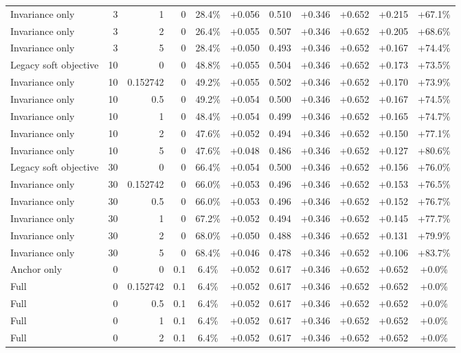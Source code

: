 \begin{table}[htbp]
\begin{tabular}{lrrrccccccc}
Invariance only & 3 & 1 & 0 & 28.4\% & +0.056 & 0.510 & +0.346 & +0.652 & +0.215 & +67.1\% \\
Invariance only & 3 & 2 & 0 & 26.4\% & +0.055 & 0.507 & +0.346 & +0.652 & +0.205 & +68.6\% \\
Invariance only & 3 & 5 & 0 & 28.4\% & +0.050 & 0.493 & +0.346 & +0.652 & +0.167 & +74.4\% \\
Legacy soft objective & 10 & 0 & 0 & 48.8\% & +0.055 & 0.504 & +0.346 & +0.652 & +0.173 & +73.5\% \\
Invariance only & 10 & 0.152742 & 0 & 49.2\% & +0.055 & 0.502 & +0.346 & +0.652 & +0.170 & +73.9\% \\
Invariance only & 10 & 0.5 & 0 & 49.2\% & +0.054 & 0.500 & +0.346 & +0.652 & +0.167 & +74.5\% \\
Invariance only & 10 & 1 & 0 & 48.4\% & +0.054 & 0.499 & +0.346 & +0.652 & +0.165 & +74.7\% \\
Invariance only & 10 & 2 & 0 & 47.6\% & +0.052 & 0.494 & +0.346 & +0.652 & +0.150 & +77.1\% \\
Invariance only & 10 & 5 & 0 & 47.6\% & +0.048 & 0.486 & +0.346 & +0.652 & +0.127 & +80.6\% \\
Legacy soft objective & 30 & 0 & 0 & 66.4\% & +0.054 & 0.500 & +0.346 & +0.652 & +0.156 & +76.0\% \\
Invariance only & 30 & 0.152742 & 0 & 66.0\% & +0.053 & 0.496 & +0.346 & +0.652 & +0.153 & +76.5\% \\
Invariance only & 30 & 0.5 & 0 & 66.0\% & +0.053 & 0.496 & +0.346 & +0.652 & +0.152 & +76.7\% \\
Invariance only & 30 & 1 & 0 & 67.2\% & +0.052 & 0.494 & +0.346 & +0.652 & +0.145 & +77.7\% \\
Invariance only & 30 & 2 & 0 & 68.0\% & +0.050 & 0.488 & +0.346 & +0.652 & +0.131 & +79.9\% \\
Invariance only & 30 & 5 & 0 & 68.4\% & +0.046 & 0.478 & +0.346 & +0.652 & +0.106 & +83.7\% \\
Anchor only & 0 & 0 & 0.1 & 6.4\% & +0.052 & 0.617 & +0.346 & +0.652 & +0.652 & +0.0\% \\
Full & 0 & 0.152742 & 0.1 & 6.4\% & +0.052 & 0.617 & +0.346 & +0.652 & +0.652 & +0.0\% \\
Full & 0 & 0.5 & 0.1 & 6.4\% & +0.052 & 0.617 & +0.346 & +0.652 & +0.652 & +0.0\% \\
Full & 0 & 1 & 0.1 & 6.4\% & +0.052 & 0.617 & +0.346 & +0.652 & +0.652 & +0.0\% \\
Full & 0 & 2 & 0.1 & 6.4\% & +0.052 & 0.617 & +0.346 & +0.652 & +0.652 & +0.0\% \\

\end{tabular}
\end{table}
